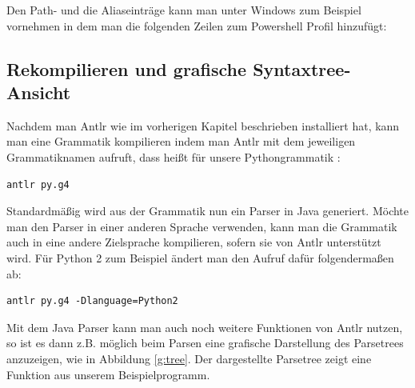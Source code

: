 Den Path- und die Aliaseinträge kann man unter Windows zum Beispiel vornehmen in dem man die folgenden Zeilen zum Powershell Profil hinzufügt: 





\subsection{Rekompilieren und grafische Syntaxtree-Ansicht}

Nachdem man Antlr wie im vorherigen Kapitel beschrieben installiert hat, kann man eine Grammatik kompilieren indem man Antlr mit dem jeweiligen Grammatiknamen aufruft, dass heißt für unsere Pythongrammatik :
\begin{lstlisting}
antlr py.g4
\end{lstlisting}
Standardmäßig wird aus der Grammatik nun ein Parser in Java generiert. Möchte man den Parser in einer anderen Sprache verwenden, kann man die Grammatik auch in eine andere Zielsprache kompilieren, sofern sie von Antlr unterstützt wird. Für Python 2 zum Beispiel ändert man den Aufruf dafür folgendermaßen ab: \enlargethispage{1cm}
\begin{lstlisting}
antlr py.g4 -Dlanguage=Python2
\end{lstlisting}



Mit dem Java Parser kann man auch noch weitere Funktionen von Antlr nutzen, so ist es dann z.B. möglich beim Parsen eine grafische Darstellung des Parsetrees anzuzeigen, wie in Abbildung \ref{g:tree}. Der dargestellte Parsetree zeigt eine Funktion aus unserem Beispielprogramm.

